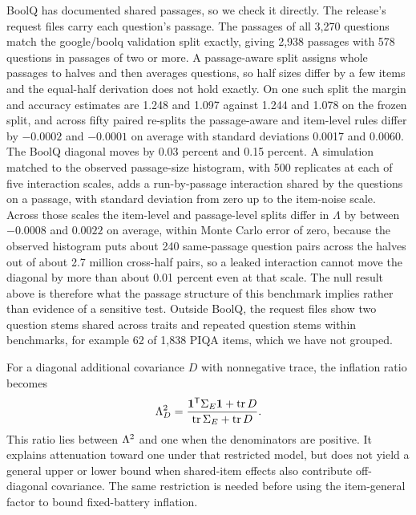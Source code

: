 BoolQ has documented shared passages, so we check it directly. The release's request files carry each question's passage. The passages of all 3,270 questions match the google/boolq validation split exactly, giving 2,938 passages with 578 questions in passages of two or more. A passage-aware split assigns whole passages to halves and then averages questions, so half sizes differ by a few items and the equal-half derivation does not hold exactly. On one such split the margin and accuracy estimates are 1.248 and 1.097 against 1.244 and 1.078 on the frozen split, and across fifty paired re-splits the passage-aware and item-level rules differ by $-0.0002$ and $-0.0001$ on average with standard deviations 0.0017 and 0.0060. The BoolQ diagonal moves by 0.03 percent and 0.15 percent. A simulation matched to the observed passage-size histogram, with 500 replicates at each of five interaction scales, adds a run-by-passage interaction shared by the questions on a passage, with standard deviation from zero up to the item-noise scale. Across those scales the item-level and passage-level splits differ in $\Lambda$ by between $-0.0008$ and $0.0022$ on average, within Monte Carlo error of zero, because the observed histogram puts about 240 same-passage question pairs across the halves out of about 2.7 million cross-half pairs, so a leaked interaction cannot move the diagonal by more than about 0.01 percent even at that scale. The null result above is therefore what the passage structure of this benchmark implies rather than evidence of a sensitive test. Outside BoolQ, the request files show two question stems shared across traits and repeated question stems within benchmarks, for example 62 of 1,838 PIQA items, which we have not grouped.

For a diagonal additional covariance $D$ with nonnegative trace, the inflation ratio becomes
\begin{equation}
\Lambda_D^2=\frac{\mathbf1^{\mathsf T}\Sigma_E\mathbf1+\operatorname{tr}D}
{\operatorname{tr}\Sigma_E+\operatorname{tr}D}.
\end{equation}
This ratio lies between $\Lambda^2$ and one when the denominators are positive. It explains attenuation toward one under that restricted model, but does not yield a general upper or lower bound when shared-item effects also contribute off-diagonal covariance. The same restriction is needed before using the item-general factor to bound fixed-battery inflation.

